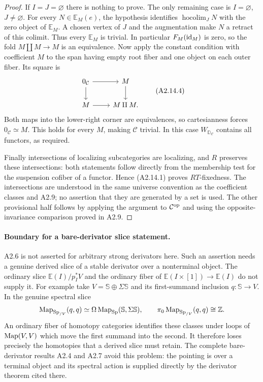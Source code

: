 \begin{proof}
If $I=J=\varnothing$ there is nothing to prove. The only remaining case
is $I=\varnothing$, $J\ne\varnothing$. For every $N\in\mathbb E_M(e)$,
the hypothesis identifies $\operatorname{hocolim}_J N$ with the zero
object of $\mathbb E_M$. A chosen vertex of $J$ and the augmentation
make $N$ a retract of this colimit. Thus every $\mathbb E_M$ is trivial.
In particular $F_M(\operatorname{id}_M)$ is zero, so the fold
$M\amalg M\to M$ is an equivalence. Now apply the constant condition
with coefficient $M$ to the span having empty root fiber and one object
on each outer fiber. Its square is
\[
 \begin{tikzcd}
 0_{\mathcal C}\ar[r]\ar[d]&M\ar[d]\\
 M\ar[r]&M\amalg M.
 \end{tikzcd}
 \tag{A2.14.4}
\]
Both maps into the lower-right corner are equivalences, so cartesianness
forces $0_{\mathcal C}\simeq M$. This holds for every $M$, making
$\mathcal C$ trivial. In this case $W_{\mathbb D_{\mathcal C}}$ contains
all functors, as required.

Finally intersections of localizing subcategories are localizing, and
$R$ preserves these intersections: both statements follow directly from
the membership test for the suspension cofiber of a functor. Hence
(A2.14.1) proves $RT$-fixedness. The intersections are understood in the
same universe convention as the coefficient classes and A2.9; no
assertion that they are generated by a set is used. The other provisional
half follows by applying the argument to $\mathcal C^{\mathrm{op}}$ and using
the opposite-invariance comparison proved in A2.9.
\end{proof}

\paragraph{Boundary for a bare-derivator slice statement.}
A2.6 is not asserted for arbitrary strong derivators here. Such an assertion
needs a genuine derived slice of a stable derivator over a nonterminal
object. The ordinary slice $\mathbb E(I)/p_I^*V$ and the ordinary fiber of
$\mathbb E(I\times[1])\to\mathbb E(I)$ do not supply it. For example take
$V=\mathbb S\oplus\Sigma\mathbb S$ and its first-summand inclusion
$q:\mathbb S\to V$. In the genuine spectral slice
\[
 \operatorname{Map}_{\mathrm{Sp}_{/V}}(q,q)
 \simeq\Omega\operatorname{Map}_{\mathrm{Sp}}(\mathbb S,\Sigma\mathbb S),
 \qquad\pi_0\operatorname{Map}_{\mathrm{Sp}_{/V}}(q,q)\cong\mathbb Z.
\]
An ordinary fiber of homotopy categories identifies these classes under
loops of $\operatorname{Map}(V,V)$ which move the first summand into the second. It
therefore loses precisely the homotopies that a derived slice must retain.
The complete bare-derivator results A2.4 and A2.7 avoid this problem: the pointing
is over a terminal object and its spectral action is supplied directly by
the derivator theorem cited there.

